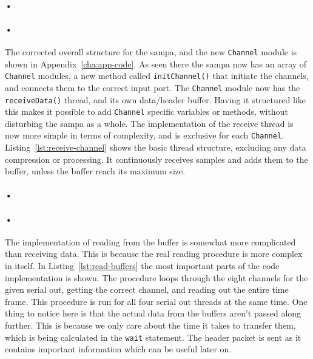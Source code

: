 \documentclass[a4paper, 12pt, openright, twoside]{report}
\newcommand{\codeword}[1]{\texttt{#1}}
\begin{document}
\paragraph{•}
\begin{minipage}{\linewidth}

\end{minipage}

\paragraph{•}
The corrected overall structure for the \gls{sampa}, and the new \codeword{Channel} module is shown in Appendix~\ref{cha:app-code}.
As seen there the \gls{sampa} now has an array of \codeword{Channel} modules, a new method called \codeword{initChannel()} that initiate the channels, and connects them to the correct input port.
The \codeword{Channel} module now has the \codeword{receiveData()} thread, and its own data/header buffer.
Having it structured like this makes it possible to add \codeword{Channel} specific variables or methods, without disturbing the \gls{sampa} as a whole.
The implementation of the receive thread is now more simple in terms of complexity, and is exclusive for each \codeword{Channel}.
Listing~\ref{lst:receive-channel} shows the basic thread structure, excluding any data compression or processing.
It continuously receives samples and adds them to the buffer, unless the buffer reach its maximum size.

\paragraph{•}
\begin{minipage}{\linewidth}

\end{minipage}

\paragraph{•}
The implementation of reading from the buffer is somewhat more complicated than receiving data.
This is because the real reading procedure is more complex in itself.
In Listing~\ref{lst:read-buffers} the most important parts of the code implementation is shown.
The procedure loops through the eight channels for the given serial out, getting the correct channel, and reading out the entire time frame.
This procedure is run for all four serial out threads at the same time.
One thing to notice here is that the actual data from the buffers aren't passed along further.
This is because we only care about the time it takes to transfer them, which is being calculated in the \codeword{wait} statement.
The header packet is sent as it contains important information which can be useful later on.
\end{document}
